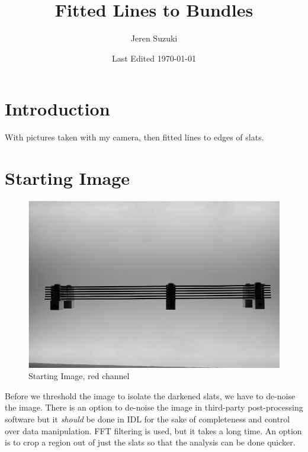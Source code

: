 \documentclass[10pt]{scrartcl}
\title{Fitted Lines to Bundles}
\author{Jeren Suzuki}
\date{Last Edited \today}
\begin{document}
\maketitle
{}
\tableofcontents
\clearpage
{}

\section{Introduction} %
\label{sec:introduction}
With pictures taken with my camera, then fitted lines to edges of slats.

\section{Starting Image} %
\label{sec:starting_image}

\begin{figure}[!ht]
    \centering
    \includegraphics[width=.7\textwidth]{../plots_tables_images/wholebundle.png}
    \caption{Starting Image, red channel}
\end{figure}

Before we threshold the image to isolate the darkened slats, we have to de-noise the image. There is an option to de-noise the image in third-party post-processing software but it \emph{should} be done in IDL for the sake of completeness and control over data manipulation. FFT filtering is used, but it takes a long time. An option is to crop a region out of just the slats so that the analysis can be done quicker. 
\end{document}
